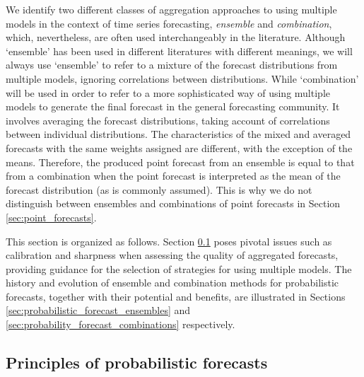 \documentclass[11pt]{article}
\begin{document}
We identify two different classes of aggregation approaches to using multiple models in the context of time series forecasting, \textit{ensemble} and \textit{combination}, which, nevertheless, are often used interchangeably in the literature. Although `ensemble' has been used in different literatures with different meanings, we will always use `ensemble' to refer to a mixture of the forecast distributions from multiple models, ignoring correlations between distributions. While `combination' will be used in order to refer to a more sophisticated way of using multiple models to generate the final forecast in the general forecasting community. It involves averaging the forecast distributions, taking account of correlations between individual distributions. The characteristics of the mixed and averaged forecasts with the same weights assigned are different, with the exception of the means. Therefore, the produced point forecast from an ensemble is equal to that from a combination when the point forecast is interpreted as the mean of the forecast distribution (as is commonly assumed). This is why we do not distinguish between ensembles and combinations of point forecasts in Section \ref{sec:point_forecasts}.

This section is organized as follows. Section \ref{sec:principles_of_probabilistic_forecasts} poses pivotal issues such as calibration and sharpness when assessing the quality of aggregated forecasts, providing guidance for the selection of strategies for using multiple models. The history and evolution of ensemble and combination methods for probabilistic forecasts, together with their potential and benefits, are illustrated in Sections \ref{sec:probabilistic_forecast_ensembles} and \ref{sec:probability_forecast_combinations} respectively.

\subsection{Principles of probabilistic forecasts}
\label{sec:principles_of_probabilistic_forecasts}
\end{document}
